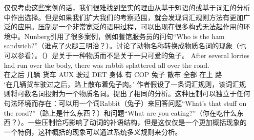     仅仅考虑这些案例的话，我们很难找到坚实的理由从基于短语的或基于词汇的分析中作出选择。但是如果我们扩大我们的考察范围，就会发现词汇规则方法有更加广泛的应用。压制是一个非常宽泛的语用过程，可以出现在很多构式无法起作用的环境中\citep{Nunberg95a-u}。Nunberg引用了很多案例，例如餐馆服务员的问句“Who is the ham sandwich?”（谁点了火腿三明治？）\citep[]{Nunberg95a-u}。\citet[]{CB92a}讨论了动物名称转换成物质名词的现象（也可以参看\citet[--43]{CB95a-u}）。（）是关于一种物质而不是关于一只可爱的兔子。
\ea
\gll After several lorries had run over the body, there was rabbit splattered all over the road.\\
     在之后 几辆 货车 AUX 驶过 DET 身体 有 COP 兔子 散布 全部 在上 路\\
\glt `在几辆货车驶过之后，路上散布着兔子肉。'
\z
作者假设了一条词汇规则，该词汇规则将可数名词投射为一个物质名词。\citet[--115]{Fillmore99a}提出了相同的分析。这种压制可以独立于任何句法环境而存在：可以用一个词Rabbit（兔子）来回答问题“What's that stuff on the road?”（路上是什么东西？）和问题“What are you eating?”（你在吃什么东西？）。一些压制恰巧影响了动词的补语结构，但是这仅仅是一个更加概括现象的一个特例，这种概括的现象可以通过系统多义规则来分析。

